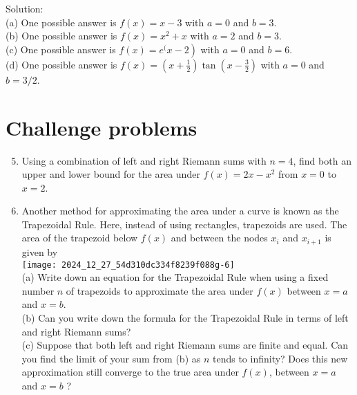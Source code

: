 \documentclass[10pt]{article}
\begin{document}
Solution:\\
(a) One possible answer is $f(x)=x-3$ with $a=0$ and $b=3$.\\
(b) One possible answer is $f(x)=x^{2}+x$ with $a=2$ and $b=3$.\\
(c) One possible answer is $\left.f(x)=e^{( } x-2\right)$ with $a=0$ and $b=6$.\\
(d) One possible answer is $f(x)=\left(x+\frac{1}{2}\right) \tan \left(x-\frac{3}{2}\right)$ with $a=0$ and $b=3 / 2$.

\section*{Challenge problems}
\begin{enumerate}
  \setcounter{enumi}{4}
  \item Using a combination of left and right Riemann sums with $n=4$, find both an upper and lower bound for the area under $f(x)=2 x-x^{2}$ from $x=0$ to $x=2$.
  \item Another method for approximating the area under a curve is known as the Trapezoidal Rule. Here, instead of using rectangles, trapezoids are used. The area of the trapezoid below $f(x)$ and between the nodes $x_{i}$ and $x_{i+1}$ is given by\\
\texttt{[image: 2024\_12\_27\_54d310dc334f8239f088g-6]}\\
(a) Write down an equation for the Trapezoidal Rule when using a fixed number $n$ of trapezoids to approximate the area under $f(x)$ between $x=a$ and $x=b$.\\
(b) Can you write down the formula for the Trapezoidal Rule in terms of left and right Riemann sums?\\
(c) Suppose that both left and right Riemann sums are finite and equal. Can you find the limit of your sum from (b) as $n$ tends to infinity? Does this new approximation still converge to the true area under $f(x)$, between $x=a$ and $x=b$ ?
\end{enumerate}
\end{document}
